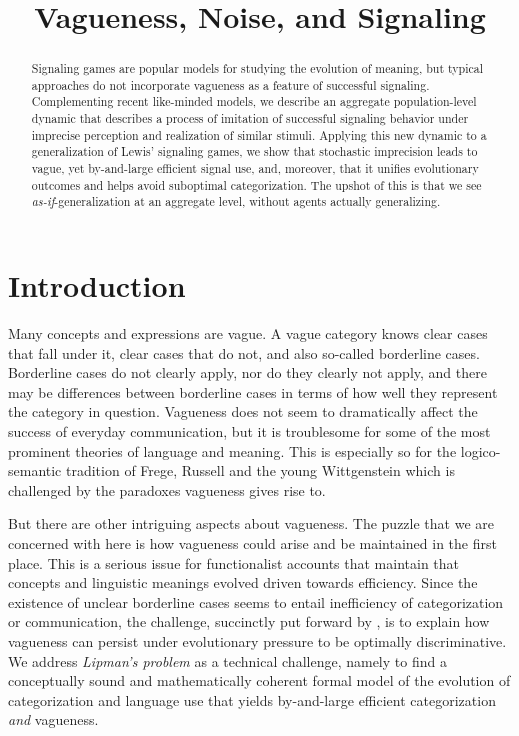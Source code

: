 \documentclass[fleqn,reqno,10pt]{article}
\title{Vagueness, Noise, and Signaling}
\date{}
\begin{document}
\maketitle

\begin{abstract}
  Signaling games are popular models for studying the evolution of meaning, but typical
  approaches do not incorporate vagueness as a feature of successful signaling.  Complementing
  recent like-minded models, we describe an aggregate population-level dynamic that describes a
  process of imitation of successful signaling behavior under imprecise perception and
  realization of similar stimuli. Applying this new dynamic to a generalization of Lewis'
  signaling games, we show that stochastic imprecision leads to vague, yet by-and-large
  efficient signal use, and, moreover, that it unifies evolutionary outcomes and helps avoid
  suboptimal categorization. The upshot of this is that we see \emph{as-if}-generalization at
  an aggregate level, without agents actually generalizing.
\end{abstract}

\section{Introduction}
\label{sec:introduction}

Many concepts and expressions are vague. A vague category knows clear
cases that fall under it, clear cases that do not, and also so-called
borderline cases. Borderline cases do not clearly apply, nor do they
clearly not apply, and there may be differences between borderline
cases in terms of how well they represent the category in
question. Vagueness does not seem to dramatically affect the success
of everyday communication, but it is troublesome for some of the most
prominent theories of language and meaning. This is especially so for the logico-semantic tradition of Frege, Russell and the young
Wittgenstein which is challenged by the paradoxes vagueness gives rise
to. 

But there are other intriguing aspects about vagueness. The puzzle
that we are concerned with here is how vagueness could arise and be
maintained in the first place. This is a serious issue for
functionalist accounts that maintain that concepts and linguistic
meanings evolved driven towards efficiency. Since the existence of
unclear borderline cases seems to entail inefficiency of
categorization or communication, the challenge, succinctly put forward
by \citet{Lipman2009:Why-is-Language}, is to explain how vagueness can
persist under evolutionary pressure to be optimally discriminative. We
address \emph{Lipman's problem} as a technical challenge, namely to
find a conceptually sound and mathematically coherent formal model of
the evolution of categorization and language use that yields
by-and-large efficient categorization \emph{and} vagueness.
\end{document}
